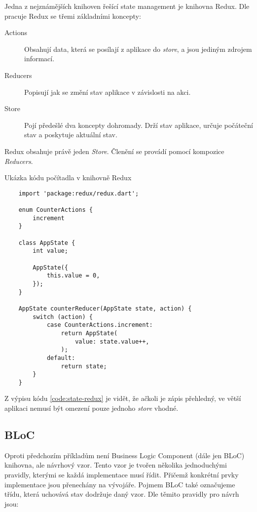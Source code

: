 Jedna z nejznámějších knihoven řešící state management je knihovna Redux.
Dle \cite{redux_basics} pracuje Redux se třemi základními koncepty:

\begin{description}
    \item[Actions] Obsahují data,
    která se posílají z aplikace do \emph{store},
    a jsou jediným zdrojem informací.
    \item[Reducers] Popisují jak se změní stav aplikace v závislosti na akci.
    \item[Store] Pojí předešlé dva koncepty dohromady.
    Drží stav aplikace,
    určuje počáteční stav
    a poskytuje aktuální stav.
\end{description}

Redux obsahuje právě jeden \emph{Store}.
Členění se provádí pomocí kompozice \emph{Reducers}.

\begin{listing}
    \caption{Ukázka kódu počítadla v knihovně Redux }
    \label{code:state-redux}
    \begin{verbatim}
    import 'package:redux/redux.dart';

    enum CounterActions {
        increment
    }
    
    class AppState {
        int value;
    
        AppState({ 
            this.value = 0,
        });
    }
    
    AppState counterReducer(AppState state, action) {
        switch (action) {
            case CounterActions.increment:
                return AppState(
                    value: state.value++,
                );
            default:
                return state;
        }
    }
    \end{verbatim}
\end{listing}

Z výpisu kódu \ref{code:state-redux} je vidět,
že ačkoli je zápis přehledný,
ve větší aplikaci nemusí být omezení pouze jednoho \emph{store} vhodné.

\subsection{BLoC}

Oproti předchozím příkladům není Business Logic Component (dále jen BLoC)
knihovna,
ale návrhový vzor.
Tento vzor je tvořen několika jednoduchými pravidly,
kterými se každá implementace musí řídit.
Přičemž konkrétní prvky implementace jsou přenechány na vývojáře.
Pojmem BLoC také označujeme třídu,
která uchovává stav dodržuje daný vzor. 
Dle \cite{googledevelopers_bloc} těmito pravidly pro návrh jsou:

